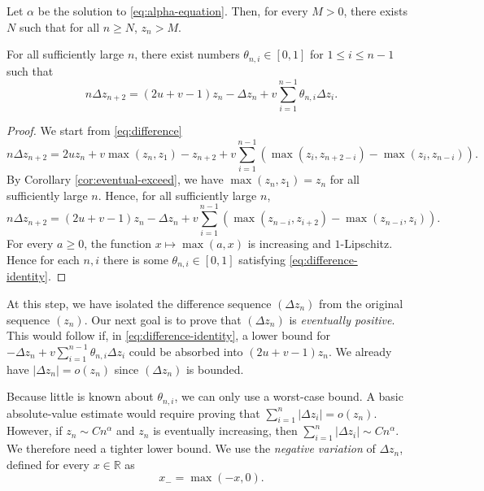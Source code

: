 \begin{corollary}
  \label{cor:eventual-exceed}
  Let $\alpha$ be the solution to \eqref{eq:alpha-equation}. Then, for every $M > 0$, there exists $N$ such that for all $n \ge N$, $z_n > M$.
\end{corollary}

\begin{lemma}
  \label{lem:difference-identity}
  For all sufficiently large $n$, there exist numbers $\theta_{n,i}\in [0,1]$ for $1\le i\le n-1$ such that
  \begin{equation}
    \label{eq:difference-identity}
    n\Delta z_{n+2} = (2u+v-1)z_n-\Delta z_n +v\sum_{i=1}^{n-1}\theta_{n,i}\Delta z_i.
  \end{equation}
\end{lemma}

\begin{proof}
  We start from \eqref{eq:difference}
  $$n\Delta z_{n+2} = 2uz_n + v\max(z_n,z_1) - z_{n+2} + v\sum_{i=1}^{n-1} (\max(z_i, z_{n+2-i}) - \max(z_i, z_{n-i})).$$
  By Corollary \ref{cor:eventual-exceed}, we have $\max(z_n,z_1)=z_n$ for all sufficiently large $n$. Hence, for all sufficiently large $n$,
  $$n\Delta z_{n+2} = (2u+v-1)z_n -\Delta z_n + v\sum_{i=1}^{n-1} (\max(z_{n-i}, z_{i+2}) - \max(z_{n-i}, z_{i})).$$
  For every $a \ge 0$, the function $x\mapsto \max(a,x)$ is increasing and $1$-Lipschitz. Hence for each $n,i$ there is some $\theta_{n,i}\in[0,1]$ satisfying \eqref{eq:difference-identity}.
\end{proof}

At this step, we have isolated the difference sequence $(\Delta z_n)$ from the original sequence $(z_n)$. Our next goal is to prove that $(\Delta z_n)$ is \textit{eventually positive}. This would follow if, in \eqref{eq:difference-identity}, a lower bound for $-\Delta z_n + v\sum_{i=1}^{n-1}\theta_{n,i}\Delta z_i$ could be absorbed into $(2u+v-1)z_n$. We already have $|\Delta z_n| = o(z_n)$ since $(\Delta z_n)$ is bounded.

Because little is known about $\theta_{n,i}$, we can only use a worst-case bound. A basic absolute-value estimate would require proving that $\sum_{i=1}^{n}|\Delta z_i| = o(z_n)$. However, if $z_n\sim Cn^\alpha$ and $z_n$ is eventually increasing, then $\sum_{i=1}^{n}|\Delta z_i| \sim Cn^\alpha$. We therefore need a tighter lower bound. We use the \textit{negative variation} of $\Delta z_n$, defined for every $x\in\mathbb{R}$ as
\begin{equation}
  x_{-} = \max(-x,0).
\end{equation}

